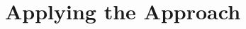 \documentclass[12pt,oneside]{book}
\begin{document}


\newpage\ 


\newpage \ \newpage \ 
\part{Applying the Approach}
\label{part3}
\newpage\ 







\newpage\ 






	
	
\end{document}
